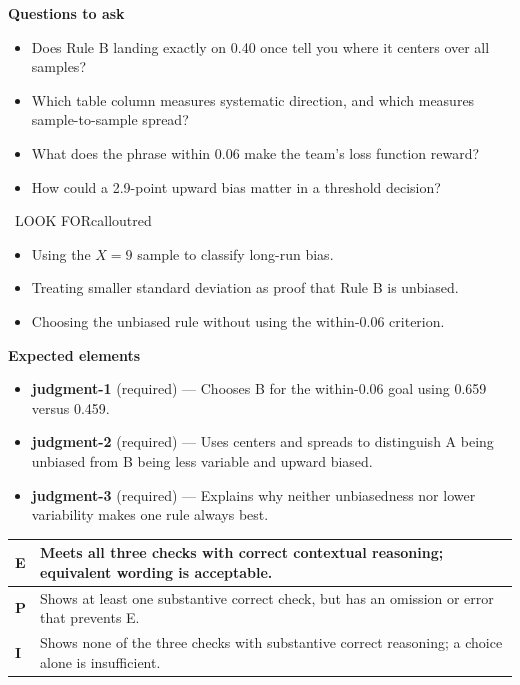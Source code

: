 \documentclass[11pt]{article}
\begin{document}
\textbf{Questions to ask}
\begin{itemize}[leftmargin=1.5em,itemsep=2pt,topsep=2pt]
  \item Does Rule B landing exactly on 0.40 once tell you where it centers over all samples?
  \item Which table column measures systematic direction, and which measures sample-to-sample spread?
  \item What does the phrase within 0.06 make the team's loss function reward?
  \item How could a 2.9-point upward bias matter in a threshold decision?
\end{itemize}

\begin{callout}{\IconWarn\ LOOK FOR}{calloutred}
\begin{itemize}[leftmargin=1.5em,itemsep=2pt,topsep=2pt]
  \item Using the $X=9$ sample to classify long-run bias.
  \item Treating smaller standard deviation as proof that Rule B is unbiased.
  \item Choosing the unbiased rule without using the within-0.06 criterion.
\end{itemize}
\end{callout}


\textbf{Expected elements}
\begin{itemize}[leftmargin=1.5em,itemsep=2pt,topsep=2pt]
  \item \textbf{judgment-1} (required) --- Chooses B for the within-0.06 goal using 0.659 versus 0.459.
  \item \textbf{judgment-2} (required) --- Uses centers and spreads to distinguish A being unbiased from B being less variable and upward biased.
  \item \textbf{judgment-3} (required) --- Explains why neither unbiasedness nor lower variability makes one rule always best.
\end{itemize}

{\small\renewcommand{\arraystretch}{1.25}
\noindent\begin{tabular}{|p{0.5in}|p{5.9in}|}
\hline
\textbf{E} & Meets all three checks with correct contextual reasoning; equivalent wording is acceptable. \\ \hline
\textbf{P} & Shows at least one substantive correct check, but has an omission or error that prevents E. \\ \hline
\textbf{I} & Shows none of the three checks with substantive correct reasoning; a choice alone is insufficient. \\ \hline
\end{tabular}}
\end{document}
